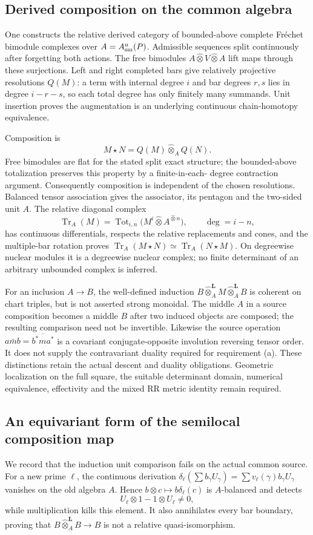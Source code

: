 \documentclass[11pt]{amsart}
\theoremstyle{definition}
\theoremstyle{remark}
\begin{document}
\subsection{Derived composition on the common algebra}
One constructs the relative derived category of bounded-above
complete Fr\'echet bimodule complexes over $A=A_{\rm sm}^u(P)$.
Admissible sequences split continuously after forgetting both actions.
The free bimodules $A\widehat\otimes V\widehat\otimes A$ lift maps
through these surjections. Left and right completed bars give relatively
projective resolutions $Q(M)$: a term with internal degree $i$ and bar
degrees $r,s$ lies in degree $i-r-s$, so each total degree has only
finitely many summands. Unit insertion proves the augmentation is an
underlying continuous chain-homotopy equivalence.

Composition is
\[
 M\star N=Q(M)\widehat\otimes_A Q(N).
\]
Free bimodules are flat for the stated split exact structure; the
bounded-above totalization preserves this property by a finite-in-each-
degree contraction argument. Consequently composition is independent
of the chosen resolutions. Balanced tensor association gives the
associator, its pentagon and the two-sided unit $A$. The relative
diagonal complex
\[
 \operatorname{Tr}_A(M)
    =\operatorname{Tot}_{i,n}\bigl(M^i\widehat\otimes A^{\widehat\otimes n}\bigr),
 \qquad \deg=i-n,
\]
has continuous differentials, respects the relative replacements and
cones, and the multiple-bar rotation proves
$\operatorname{Tr}_A(M\star N)\simeq\operatorname{Tr}_A(N\star M)$.
On degreewise nuclear modules it is a degreewise nuclear complex;
no finite determinant of an arbitrary unbounded complex is inferred.

For an inclusion $A\to B$, the well-defined induction
$B\widehat\otimes_A^{\mathbf L}M\widehat\otimes_A^{\mathbf L}B$
is coherent on chart triples, but is not asserted strong monoidal.
The middle $A$ in a source composition becomes a middle $B$ after
two induced objects are composed; the resulting comparison need not
be invertible. Likewise the source operation
$a\bar m b=\overline{b^*ma^*}$ is a covariant conjugate-opposite
involution reversing tensor order. It does not supply the contravariant
duality required for requirement (a). These distinctions retain the actual descent
and duality obligations. Geometric localization on the full square,
the suitable determinant domain, numerical equivalence, effectivity
and the mixed RR metric identity remain required.

\subsection{An equivariant form of the semilocal composition map}
We record that the induction unit comparison fails on the actual
common source. For a new prime $\ell$, the continuous derivation
$\delta_\ell(\sum b_\gamma U_\gamma)=\sum v_\ell(\gamma)b_\gamma U_\gamma$
vanishes on the old algebra $A$. Hence
$b\otimes c\mapsto b\delta_\ell(c)$ is $A$-balanced and detects
\[
 U_\ell\otimes1-1\otimes U_\ell\ne0,
\]
while multiplication kills this element. It also annihilates every
bar boundary, proving that $B\widehat\otimes_A^{\mathbf L}B\to B$
is not a relative quasi-isomorphism.
\end{document}
